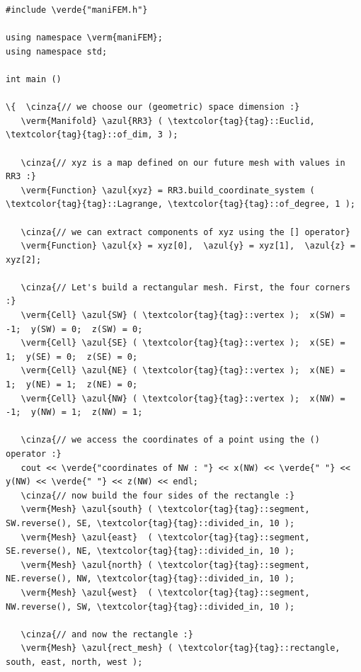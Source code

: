 \begin{Verbatim}[commandchars=\\\{\},formatcom=\small\tt,frame=single,
   label=parag-\ref{\numb section 1.\numb parag 1}.cpp,rulecolor=\color{coment},
   baselinestretch=0.94,framesep=2mm                                            ]
#include \verde{"maniFEM.h"}

using namespace \verm{maniFEM};
using namespace std;

int main ()

\{  \cinza{// we choose our (geometric) space dimension :}
   \verm{Manifold} \azul{RR3} ( \textcolor{tag}{tag}::Euclid, \textcolor{tag}{tag}::of_dim, 3 );
   
   \cinza{// xyz is a map defined on our future mesh with values in RR3 :}
   \verm{Function} \azul{xyz} = RR3.build_coordinate_system ( \textcolor{tag}{tag}::Lagrange, \textcolor{tag}{tag}::of_degree, 1 );

   \cinza{// we can extract components of xyz using the [] operator}
   \verm{Function} \azul{x} = xyz[0],  \azul{y} = xyz[1],  \azul{z} = xyz[2];

   \cinza{// Let's build a rectangular mesh. First, the four corners :}
   \verm{Cell} \azul{SW} ( \textcolor{tag}{tag}::vertex );  x(SW) = -1;  y(SW) = 0;  z(SW) = 0;
   \verm{Cell} \azul{SE} ( \textcolor{tag}{tag}::vertex );  x(SE) =  1;  y(SE) = 0;  z(SE) = 0;
   \verm{Cell} \azul{NE} ( \textcolor{tag}{tag}::vertex );  x(NE) =  1;  y(NE) = 1;  z(NE) = 0;
   \verm{Cell} \azul{NW} ( \textcolor{tag}{tag}::vertex );  x(NW) = -1;  y(NW) = 1;  z(NW) = 1;
   
   \cinza{// we access the coordinates of a point using the () operator :}								
   cout << \verde{"coordinates of NW : "} << x(NW) << \verde{" "} << y(NW) << \verde{" "} << z(NW) << endl;
   \cinza{// now build the four sides of the rectangle :}
   \verm{Mesh} \azul{south} ( \textcolor{tag}{tag}::segment, SW.reverse(), SE, \textcolor{tag}{tag}::divided_in, 10 );
   \verm{Mesh} \azul{east}  ( \textcolor{tag}{tag}::segment, SE.reverse(), NE, \textcolor{tag}{tag}::divided_in, 10 );
   \verm{Mesh} \azul{north} ( \textcolor{tag}{tag}::segment, NE.reverse(), NW, \textcolor{tag}{tag}::divided_in, 10 );
   \verm{Mesh} \azul{west}  ( \textcolor{tag}{tag}::segment, NW.reverse(), SW, \textcolor{tag}{tag}::divided_in, 10 );
   
   \cinza{// and now the rectangle :}
   \verm{Mesh} \azul{rect_mesh} ( \textcolor{tag}{tag}::rectangle, south, east, north, west );


\end{Verbatim}
